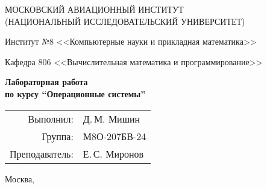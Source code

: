 \begin{titlepage}
\begin{center}
\large
МОСКОВСКИЙ АВИАЦИОННЫЙ ИНСТИТУТ\\ (НАЦИОНАЛЬНЫЙ ИССЛЕДОВАТЕЛЬСКИЙ УНИВЕРСИТЕТ)

\vspace{20pt}

Институт №8 <<Компьютерные науки и прикладная математика>>

Кафедра 806 <<Вычислительная математика и программирование>>
\end{center}

\vspace{60pt}

\begin{center}
\bfseries
\large
Лабораторная работа  \\по курсу \enquote{Операционные системы}

\vspace{54pt}

\end{center}

\vfill

\begin{flushright}
\large
\begin{tabular}{rl}
Выполнил: & Д.\,М. Мишин \\
Группа: & М8О-207БВ-24 \\
Преподаватель: & Е.\,С. Миронов \\
\end{tabular}
\end{flushright}

\vspace{92pt}

\begin{center}
\large
Москва, \the\year
\end{center}
\end{titlepage}

\pagebreak